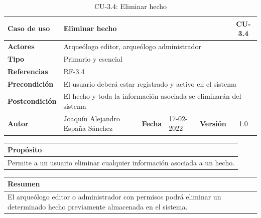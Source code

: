     \begin{table}[H]
    \begin{center}
        \begin{adjustbox}{width=\textwidth}
        \begin{tabular}{ | l | l | l | l | c | c | } 
            \hline
            \textbf{Caso de uso} & \multicolumn{4}{l|}{Eliminar hecho} & \cellcolor{gray!50} \textbf{CU-3.4}\\
            \hline
            \textbf{Actores} & \multicolumn{5}{p{0.9\linewidth}|}{Arqueólogo editor, arqueólogo administrador} \\
            \hline
            \textbf{Tipo} & \multicolumn{5}{l|}{Primario y esencial} \\
            \hline
            \textbf{Referencias} & \multicolumn{3}{l|}{RF-3.4} & \multicolumn{2}{l|}{ }\\
            \hline
            \textbf{Precondición} & \multicolumn{5}{l|}{El usuario deberá estar registrado y activo en el sistema} \\
            \hline
            \textbf{Postcondición} & \multicolumn{5}{l|}{El hecho y toda la información asociada se eliminarán del sistema} \\
            \hline
            \textbf{Autor} & \multicolumn{1}{p{0.25\linewidth}|}{Joaquín Alejandro España Sánchez} & \textbf{Fecha} & 
            17-02-2022     & \textbf{Versión}                                                      & 1.0\\
            \hline
        \end{tabular}
        \end{adjustbox}
        \caption{CU-3.4: Eliminar hecho}
        \label{tab:delete-fact}
    \end{center}
    \end{table}

    \begin{table}[H]
        \centering
        \begin{tabularx}{\textwidth}{@{} |L |@{}} \hline
            \textbf{Propósito} \\
            \hline
            Permite a un usuario eliminar cualquier información asociada a un hecho. \\
            \hline
        \end{tabularx}
    \end{table}

    \begin{table}[H]
        \centering
        \begin{tabularx}{\textwidth}{@{} |L |@{}} \hline
            \textbf{Resumen} \\
            \hline
            El arqueólogo editor o administrador con permisos podrá eliminar un determinado
            hecho previamente almacenada en el sistema. \\
            \hline
        \end{tabularx}
    \end{table}

